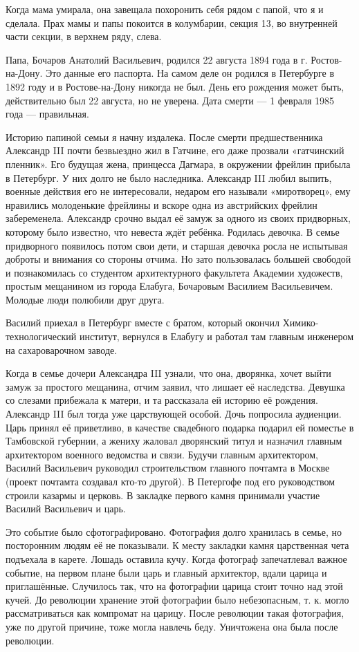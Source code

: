 Когда мама умирала, она завещала похоронить себя рядом с папой, что я и сделала.
Прах мамы и папы покоится в колумбарии, секция 13, во внутренней части секции, в верхнем ряду, слева.

Папа, Бочаров Анатолий Васильевич, родился  22 августа 1894 года  в  г. Ростов-на-Дону.
Это данные его паспорта.
На самом деле он родился в Петербурге в 1892 году  и в Ростове-на-Дону никогда не был.
День его рождения может быть, действительно был 22 августа, но не уверена.
Дата смерти --- 1 февраля 1985 года  --- правильная.

Историю папиной семьи  я начну издалека.
После смерти предшественника  Александр III  почти безвыездно жил в Гатчине, его даже прозвали «гатчинский пленник».
Его будущая жена, принцесса Дагмара, в окружении фрейлин прибыла в Петербург.
У них долго не было наследника.
Александр III любил выпить, военные действия его не интересовали, недаром его называли «миротворец», ему нравились молоденькие фрейлины и вскоре одна из австрийских фрейлин забеременела.
Александр срочно выдал её замуж за одного из своих придворных, которому было известно, что невеста ждёт ребёнка.
Родилась девочка.
В семье придворного появилось потом свои дети, и старшая девочка  росла не испытывая доброты и внимания со стороны отчима.
Но зато пользовалась большей свободой и познакомилась со студентом архитектурного факультета Академии художеств, простым мещанином из города Елабуга, Бочаровым Василием Васильевичем.
Молодые люди полюбили друг друга.

Василий приехал в Петербург вместе с братом, который окончил Химико-технологический институт, вернулся в  Елабугу  и работал там главным инженером на сахароварочном заводе.

Когда в семье дочери Александра III узнали, что она, дворянка, хочет выйти замуж за простого мещанина, отчим заявил, что лишает её наследства.
Девушка со слезами прибежала к матери, и та рассказала ей историю её рождения.
Александр III был тогда уже царствующей особой.
Дочь попросила аудиенции.
Царь принял её приветливо, в качестве свадебного подарка подарил ей поместье в Тамбовской губернии, а жениху жаловал дворянский титул и назначил главным архитектором военного ведомства и связи.
Будучи главным архитектором,  Василий Васильевич руководил строительством главного почтамта  в Москве (проект почтамта создавал кто-то другой).
В Петергофе под его руководством строили казармы и церковь.
В закладке первого камня принимали участие Василий Васильевич и царь.

Это событие было сфотографировано.
Фотография долго хранилась в семье, но посторонним людям её не показывали.
К месту закладки камня царственная чета подъехала в карете.
Лошадь оставила  кучу.
Когда фотограф запечатлевал важное событие, на первом плане были царь и главный архитектор, вдали царица и приглашённые.
Случилось так, что на фотографии царица стоит точно над этой кучей.
До революции хранение этой фотографии было небезопасным, т. к. могло рассматриваться как компромат на царицу.
После революции такая фотография, уже по другой причине, тоже могла навлечь беду.
Уничтожена она была после революции.

